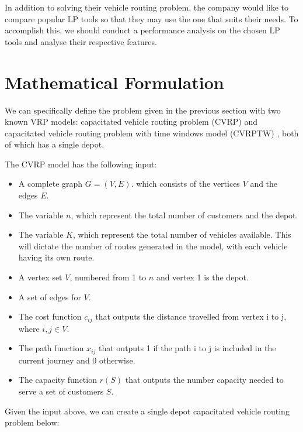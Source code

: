 In addition to solving their vehicle routing problem,  the company would like to compare popular LP tools
 so that they may use the one that suits their needs. To accomplish this, we should conduct a performance analysis on the chosen LP tools
and analyse their respective features.

\section{Mathematical Formulation}
We can specifically define the problem given in the previous section with two known VRP models: capacitated
vehicle routing problem (CVRP) \cite{Daneshzand2011} and capacitated vehicle routing problem
with time windows model (CVRPTW) \cite{Daneshzand2011, Desrochers1988}, both of which has a single depot.

The CVRP model has the following input:
\begin{itemize}
\item A complete graph \(G = (V, E)\). which consists of the vertices \(V\) and the edges \(E\).
\item The variable \(n\), which represent the total number of customers and the depot.
\item The variable \(K\), which represent the total number of vehicles available. This will dictate the number of routes
generated in the model, with each vehicle having its own route.
\item A vertex set \(V\), numbered from 1 to \(n\) and vertex 1 is the depot.
\item A set of edges for \(V\).
\item The cost function \(c_{ij}\) that outputs the distance travelled from vertex i to j, where \(i,j \in V\).
\item The path function \(x_{ij}\) that outputs 1 if the path i to j is included in the current journey and 0 otherwise.
\item The capacity function \(r(S)\) that outputs the number capacity needed to serve a set of customers \(S\).
\end{itemize}

Given the input above, we can create a single depot capacitated vehicle routing problem below:

\vspace{0.5cm}

